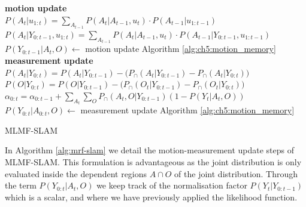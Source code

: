 \begin{center}
\begin{minipage}{\linewidth}

\begin{algorithm}[H]
\label{alg:mrf-slam}
\BlankLine
\textbf{motion update}\\
$P(A_t|u_{1:t})  = \sum\limits_{A_{t-1}} P(A_t|A_{t-1},u_t) \cdot P(A_{t-1}|u_{1:t-1})$\\
$P(A_t|Y_{0:t-1},u_{1:t})  = \sum\limits_{A_{t-1}} P(A_t|A_{t-1},u_t) \cdot P(A_{t-1}|Y_{0:t-1},u_{1:t-1})$\\
$P(Y_{0:t-1}|A_t,O) \gets$ motion update Algorithm \ref{alg:ch5:motion_memory} 
\BlankLine
\textbf{measurement update}
\BlankLine
$P(A_t|Y_{0:t}) = P(A_t|Y_{0:t-1}) - \Big(P_{\cap}(A_t|Y_{0:t-1}) -  P_{\cap}(A_t|Y_{0:t}) \Big)$  \\
$P(O|Y_{0:t}) = P(O|Y_{0:t-1}) -  \Big(  P_{\cap}(O_t|Y_{0:t-1}) -  P_{\cap}(O_t|Y_{0:t})\Big)$    \\
$\alpha_{0:t} = \alpha_{0:t-1} +  \sum\limits_{A_t}\sum\limits_{O} P_{\cap}(A_t,O|Y_{0:t-1}) (1 - P(Y_t|A_t,O))$ \\

$P(Y_{0:t}|A_{0:t},O) \gets$ measurement update Algorithm \ref{alg:ch5:motion_memory} 
\caption{MLMF-SLAM}
\end{algorithm} 
\end{minipage}
\end{center}
In Algorithm \ref{alg:mrf-slam} we detail the motion-measurement update steps of MLMF-SLAM.
This formulation is advantageous as the joint distribution is only evaluated inside the dependent regions 
$A\cap O$ of the joint distribution. Through the term $P(Y_{0:t}|A_t,O)$ we keep 
track of the normalisation factor $P(Y_t|Y_{0:t-1})$ which 
is a scalar, and where we have previously applied the likelihood function. 

